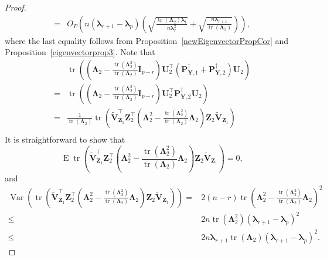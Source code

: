 \documentclass[10pt]{book}
\theoremstyle{definition}
\DeclareMathOperator{\mytr}{tr}
\DeclareMathOperator{\myE}{E}
\DeclareMathOperator{\myVar}{Var}
\newcommand{\bZ}{\mathbf{Z}}
\newcommand{\bP}{\mathbf{P}}
\newcommand{\bY}{\mathbf{Y}}
\newcommand{\bI}{\mathbf{I}}
\newcommand{\bU}{\mathbf{U}}
\newcommand{\bV}{\mathbf{V}}
\newcommand{\bfsym}[1]{\ensuremath{\boldsymbol{#1}}}
\def\blambda {\bfsym {\lambda}}
\def\bLambda {\bfsym {\Lambda}}
\begin{document}
\begin{proof}
\begin{equation}
\begin{split}
    =&
    O_P\left(n(\blambda_{r+1}-\blambda_p)\left(\sqrt{\frac{\mytr(\bLambda_2)\blambda_1}{n\blambda_r^2}}+\sqrt{\frac{n\blambda_{r+1}}{\mytr(\bLambda_2)}}\right)\right),
           \end{split}
       \end{equation}
       where the last equality follows from Proposition~\ref{newEigenvectorPropCor} and Proposition~\ref{eigenvectorprop3}.
       Note that
       \begin{equation*}
           \begin{split}
        &
        \mytr\left(
            \left(\bLambda_2-\frac{\mytr(\bLambda_2^2)}{\mytr(\bLambda_2)}\bI_{p-r}\right) \bU_2^\top \left(\bP_{\bY,1}^\dagger+\bP_{\bY,2}^\dagger\right) \bU_2 
    \right)
    \\
        =&
        \mytr\left(
            \left(\bLambda_2-\frac{\mytr(\bLambda_2^2)}{\mytr(\bLambda_2)}\bI_{p-r}\right) \bU_2^\top \bP_{\bY,2}^\dagger \bU_2 
    \right)
    \\
    =&
    \frac{1}{\mytr(\bLambda_2)} 
    \mytr\left(\tilde{\bV}_{\bZ_1}^\top \bZ_2^\top 
 \left(
       \bLambda_2^2 
    -\frac{\mytr(\bLambda_2^2)}{\mytr(\bLambda_2)}\bLambda_2
 \right)
\bZ_2 \tilde{\bV}_{\bZ_1}\right)
    \\
           \end{split}
       \end{equation*}
       It is straightforward to show that
       \begin{equation*}
    \myE \mytr\left(\tilde{\bV}_{\bZ_1}^\top \bZ_2^\top 
 \left(
       \bLambda_2^2 
    -\frac{\mytr(\bLambda_2^2)}{\mytr(\bLambda_2)}\bLambda_2
 \right)
\bZ_2 \tilde{\bV}_{\bZ_1}\right)
=0,
       \end{equation*}
       and
       \begin{equation*}
           \begin{split}
    \myVar\left(
        \mytr\left(\tilde{\bV}_{\bZ_1}^\top \bZ_2^\top 
 \left(
       \bLambda_2^2 
    -\frac{\mytr(\bLambda_2^2)}{\mytr(\bLambda_2)}\bLambda_2
 \right)
\bZ_2 \tilde{\bV}_{\bZ_1}\right)
\right)
=&2(n-r)\mytr
 \left(
       \bLambda_2^2 
    -\frac{\mytr(\bLambda_2^2)}{\mytr(\bLambda_2)}\bLambda_2
\right)^2
\\
\leq & 2n \mytr(\bLambda_2^2) (\blambda_{r+1}-\blambda_p)^2
\\
\leq & 2n \blambda_{r+1}\mytr(\bLambda_2) (\blambda_{r+1}-\blambda_p)^2
.
           \end{split}
       \end{equation*}

\end{proof}
\end{document}

